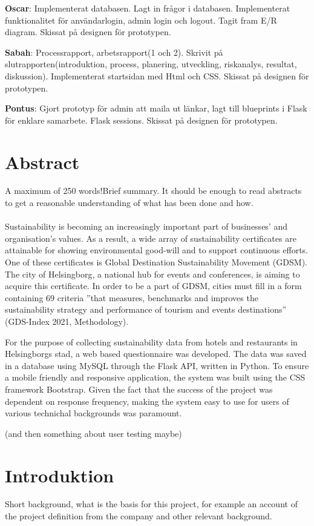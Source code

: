 \documentclass[12pt]{article}
\begin{document}
\textbf{Oscar}: Implementerat databasen. Lagt in frågor i databasen. Implementerat funktionalitet för användarlogin, admin login och logout. Tagit fram E/R diagram. Skissat på designen för prototypen.

\textbf{Sabah}: Processrapport, arbetsrapport(1 och 2). Skrivit på slutrapporten(introduktion, process, planering, utveckling, riskanalys, resultat, diskussion). Implementerat startsidan med Html och CSS. Skissat på designen för prototypen.  

\textbf{Pontus}: Gjort prototyp för admin att maila ut länkar, lagt till blueprints i Flask för enklare samarbete. Flask sessions. Skissat på designen för prototypen.

\newpage
\section{Abstract}
A maximum of 250 words!Brief summary. It should be enough to read abstracts to get a reasonable understanding of what has been done and how.
\\\\
Sustainability is becoming an increasingly important part of businesses’ and organisation’s values. As a result, a wide array of sustainability certificates are attainable for showing environmental good-will and to support continuous efforts. One of these certificates is Global Destination Sustainability Movement (GDSM). The city of Helsingborg, a national hub for events and conferences, is aiming to acquire this certificate. In order to be a part of GDSM, cities must fill in a form containing 69 criteria ”that measures, benchmarks and improves the sustainability strategy and performance of tourism and events destinations” (GDS-Index 2021, Methodology). 

For the purpose of collecting sustainability data from hotels and restaurants in Helsingborgs stad, a web based questionnaire was developed. The data was saved in a database using MySQL through the Flask API, written in Python. To ensure a mobile friendly and responsive application, the system was built using the CSS framework Bootstrap. 
Given the fact that the success of the project was dependent on response frequency, making the system easy to use for users of various technichal backgrounds was paramount. 

(and then something about user testing maybe)

\newpage
\section{Introduktion}
Short background, what is the basis for this project, for example an account of the project definition from the company and other relevant background.
\end{document}
